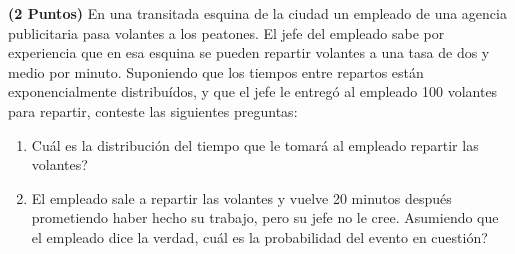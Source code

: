 \documentclass[ a4paper, twoside, 11pt]{article}
\begin{document}
\begin{problem}
\textbf{(2 Puntos)} En una transitada esquina de la ciudad un empleado de una agencia publicitaria pasa volantes a los peatones. El jefe del empleado sabe por experiencia que en esa esquina se pueden repartir volantes a una tasa de dos y medio por minuto. Suponiendo que los tiempos entre repartos est\'an exponencialmente distribu\'idos, y que el jefe le entreg\'o al empleado 100 volantes para repartir, conteste las siguientes preguntas: 
\begin{enumerate}[label=\alph*)]
\item Cu\'al es la distribuci\'on del tiempo que le tomar\'a al empleado repartir las volantes? 
\item El empleado sale a repartir las volantes y vuelve 20 minutos despu\'es prometiendo haber hecho su trabajo, pero su jefe no le cree. Asumiendo que el empleado dice la verdad, \linebreak cu\'al es la probabilidad del evento en cuesti\'on? 
\end{enumerate}

\end{problem}
\vspace{\baselineskip}
\end{document}
